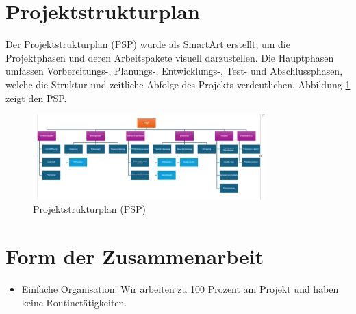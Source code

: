 \documentclass[ngerman]{report}
\begin{document}
    \section{Projektstrukturplan}
    Der Projektstrukturplan (PSP) wurde als SmartArt erstellt, um die Projektphasen und deren 
    Arbeitspakete visuell darzustellen. Die Hauptphasen umfassen Vorbereitungs-,
    Planungs-, Entwicklungs-, Test- und Abschlussphasen, welche die Struktur und
    zeitliche Abfolge des Projekts verdeutlichen. Abbildung \ref{fig:Abbildung 3} zeigt den PSP.

    \begin{figure}[htbp]
        \centering
        \includegraphics[width=0.8\textwidth]{images/PSP.png}
        \caption{Projektstrukturplan (PSP)}
        \label{fig:Abbildung 3}
    \end{figure}
    
    \section{Form der Zusammenarbeit}
    \begin{itemize}
        \item Einfache Organisation: Wir arbeiten zu 100 Prozent am Projekt und haben keine Routinetätigkeiten.
    \end{itemize}
\end{document}
